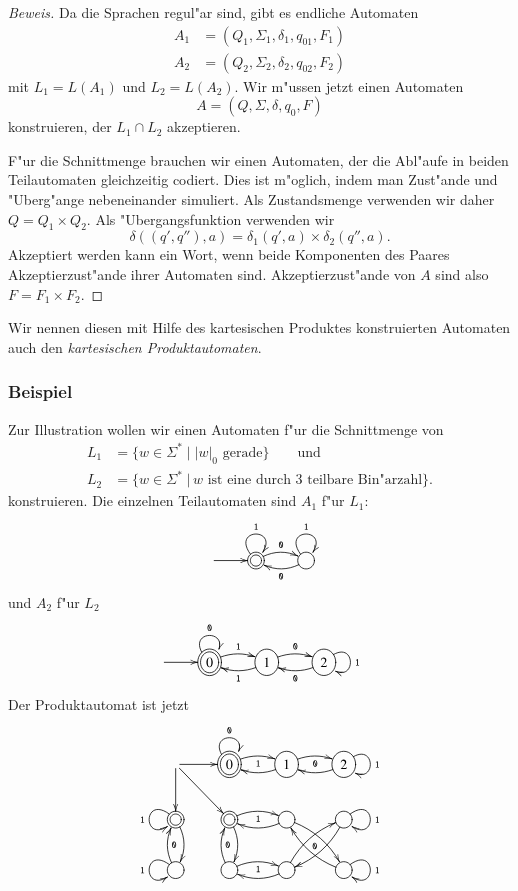 \begin{proof}[Beweis]
Da die Sprachen regul"ar sind, gibt es endliche Automaten 
\begin{align*}
A_1&=(Q_1,\Sigma_1,\delta_1, q_{01}, F_1)\\
A_2&=(Q_2,\Sigma_2,\delta_2, q_{02}, F_2)
\end{align*}
mit $L_1=L(A_1)$ und $L_2=L(A_2)$. Wir m"ussen
jetzt einen Automaten
\[
A = (Q, \Sigma, \delta, q_0, F)
\]
konstruieren, der $L_1\cap L_2$ akzeptieren.

F"ur die Schnittmenge brauchen wir einen Automaten, der die Abl"aufe 
in beiden Teilautomaten gleichzeitig codiert.
Dies ist m"oglich, indem man Zust"ande und "Uberg"ange nebeneinander
simuliert.
Als Zustandsmenge verwenden wir daher $Q=Q_1\times Q_2$. Als "Ubergangsfunktion
verwenden wir
\[
\delta((q',q''),a)=\delta_1(q',a)\times \delta_2(q'',a).
\]
Akzeptiert werden kann ein Wort, wenn beide Komponenten des Paares 
Akzeptierzust"ande ihrer Automaten sind.
Akzeptierzust"ande von $A$ sind also $F=F_1\times F_2$.
\end{proof}

Wir nennen diesen mit Hilfe des kartesischen Produktes konstruierten
Automaten auch den
{\em kartesischen Produktautomaten}\label{reg_produktautomat}.

\subsubsection{Beispiel}
Zur Illustration wollen 
wir einen Automaten f"ur die Schnittmenge von
\begin{align*}
L_1&=\{w\in\Sigma^*\;|\; \text{$|w|_0$ gerade}\}\qquad\text{und}\\
L_2&=\{w\in\Sigma^*\;|\,\text{$w$ ist eine durch 3 teilbare Bin"arzahl}\}.
\end{align*}
konstruieren. Die einzelnen Teilautomaten sind $A_1$ f"ur $L_1$:
\[
\entrymodifiers={++[o][F]}
\xymatrix{
*+\txt{}\ar[r]
	&*++[o][F=]{} \ar@/^/[r]^{\tt 0} \ar@(ul,ur)^{\tt 1}
		&{} \ar@/^/[l]^{\tt 0} \ar@(ul,ur)^{\tt 1}
}
\]
und $A_2$ f"ur $L_2$
\[
\entrymodifiers={++[o][F]}
\xymatrix{
*+\txt{}\ar[r]
	&*++[o][F=]{0} \ar@/^/[r]^{\tt 1} \ar@(ul,ur)^{\tt 0}
		&{1} \ar@/^/[l]^{\tt 1} \ar@/^/[r]^{\tt 0}
			&{2}\ar@(ur,dr)^{\tt 1} \ar@/^/[l]^{\tt 0}
}
\]
Der Produktautomat ist jetzt
\[
\entrymodifiers={++[o][F]}
\xymatrix{
*+\txt{} \ar[r] \ar[d] \ar[dr]
	&*++[o][F=]{0} \ar@/^/[r]_{\tt 1} \ar@(ul,ur)^{\tt 0}
		&{1} \ar@/^/[l] \ar@/^/[r]_{\tt 0}
			&{2}\ar@(ur,dr)^{\tt 1} \ar@/^/[l]
\\
*++[o][F=]{} \ar@/^/[d] \ar@(ul,dl)_{\tt 1}
	&*++[o][F=]{} \ar@/^/[d]{\tt 0} \ar@/^/[r]_{\tt 1}
		&{} \ar@/^/[l] \ar@/^/[dr]_{\tt 0}
			&{}\ar@(ur,dr)^{\tt 1} \ar@/^/[dl]
\\
{} \ar@/^/[u]_{\tt 0} \ar@(ul,dl)_{\tt 1}
	&{} \ar@/^/[u]_{\tt 0} \ar@/^/[r]_{\tt 1}
		&{} \ar@/^/[l] \ar@/^/[ur]
			&{}\ar@(ur,dr)^{\tt 1} \ar@/^/[ul]
}
\]

